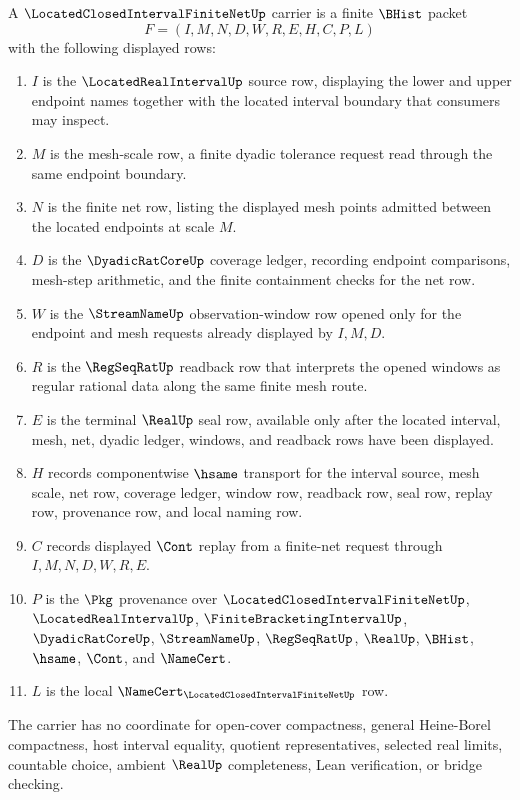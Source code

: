 \begin{definition}
\label{def:located-closed-interval-finite-net-carrier}
A $\LocatedClosedIntervalFiniteNetUp$ carrier is a finite $\BHist$ packet
$$
F=(I,M,N,D,W,R,E,H,C,P,L)
$$
with the following displayed rows:
\begin{enumerate}
\item $I$ is the $\LocatedRealIntervalUp$ source row, displaying the lower and upper endpoint names together with the located interval boundary that consumers may inspect.
\item $M$ is the mesh-scale row, a finite dyadic tolerance request read through the same endpoint boundary.
\item $N$ is the finite net row, listing the displayed mesh points admitted between the located endpoints at scale $M$.
\item $D$ is the $\DyadicRatCoreUp$ coverage ledger, recording endpoint comparisons, mesh-step arithmetic, and the finite containment checks for the net row.
\item $W$ is the $\StreamNameUp$ observation-window row opened only for the endpoint and mesh requests already displayed by $I,M,D$.
\item $R$ is the $\RegSeqRatUp$ readback row that interprets the opened windows as regular rational data along the same finite mesh route.
\item $E$ is the terminal $\RealUp$ seal row, available only after the located interval, mesh, net, dyadic ledger, windows, and readback rows have been displayed.
\item $H$ records componentwise $\hsame$ transport for the interval source, mesh scale, net row, coverage ledger, window row, readback row, seal row, replay row, provenance row, and local naming row.
\item $C$ records displayed $\Cont$ replay from a finite-net request through $I,M,N,D,W,R,E$.
\item $P$ is the $\Pkg$ provenance over $\LocatedClosedIntervalFiniteNetUp$, $\LocatedRealIntervalUp$, $\FiniteBracketingIntervalUp$, $\DyadicRatCoreUp$, $\StreamNameUp$, $\RegSeqRatUp$, $\RealUp$, $\BHist$, $\hsame$, $\Cont$, and $\NameCert$.
\item $L$ is the local $\NameCert_{\LocatedClosedIntervalFiniteNetUp}$ row.
\end{enumerate}
The carrier has no coordinate for open-cover compactness, general Heine-Borel compactness, host interval equality, quotient representatives, selected real limits, countable choice, ambient $\RealUp$ completeness, Lean verification, or bridge checking.
\end{definition}

